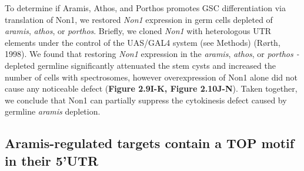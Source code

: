 \documentclass[12pt,oneside]{reedthesis}
\begin{document}
To determine if Aramis, Athos, and Porthos promotes GSC differentiation
via translation of Non1, we restored \emph{Non1} expression in germ cells
depleted of \emph{aramis}, \emph{athos}, or \emph{porthos}. Briefly, we cloned \emph{Non1}
with heterologous UTR elements under the control of the UAS/GAL4 system
(see Methods) (Rørth, 1998). We found that
restoring \emph{Non1} expression in the \emph{aramis}, \emph{athos}, or \emph{porthos
-}depleted germline significantly attenuated the stem cysts and
increased the number of cells with spectrosomes, however overexpression
of Non1 alone did not cause any noticeable defect (\textbf{Figure 2.9I-K, Figure 2.10J-N}).
Taken together, we conclude that Non1 can partially suppress
the cytokinesis defect caused by germline \emph{aramis} depletion.

\hypertarget{aramis-regulated-targets-contain-a-top-motif-in-their-5utr}{%
\subsection{Aramis-regulated targets contain a TOP motif in their 5'UTR}\label{aramis-regulated-targets-contain-a-top-motif-in-their-5utr}}
\end{document}
